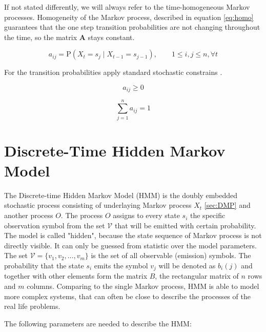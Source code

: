 \documentclass[thesis=M,english]{FITthesis}[2012/10/20]
\newcommand{\matr}[1]{\mathbf{#1}}
\begin{document}
If not stated differently, we will always refer to the time-homogeneous Markov processes. Homogeneity of the Markov process, described in equation \eqref{eq:homo} guarantees that the one step transition probabilities are not changing throughout the time, so the matrix $\matr{A}$ stays constant. 

\begin{equation}\label{eq:homo}
   a_{ij} = \mathrm{P}(X_t = s_j \mid X_{t-1} = s_{j-1} ),\qquad 1 \leq i,j \leq n, \forall t
\end{equation}

For the transition probabilities apply standard stochastic constrains \cite{Ra89}.

\begin{equation}
   a_{ij} \geq 0
\end{equation}

\begin{equation}
   \sum_{j=1}^n a_{ij} = 1
\end{equation}

\section{Discrete-Time Hidden Markov Model}

The Discrete-time Hidden Markov Model (HMM) is the doubly embedded stochastic process consisting of underlaying Markov process $X_t$ \ref{sec:DMP} and another process $O$. The process $O$ assigns to every state $s_i$ the specific observation symbol from the set $\mathcal{V}$ that will be emitted with certain probability. The model is called "hidden", because the state sequence of Markov process is not directly visible. It can only be guessed from statistic over the model parameters. The set $\mathcal{V}=\{  v_1,v_2,\dots,v_m\}$ is the set of all observable (emission) symbols. The probability that the state $s_i$ emits the symbol $v_j$ will be denoted as $b_i(j)$ and together with other elements form the matrix $B$, the rectangular matrix of $n$ rows and $m$ columns. Comparing to the single Markov process, HMM is able to model more complex systems, that can often be close to describe the processes of the real life problems.  
  
The following parameters are needed to describe the HMM:
\end{document}

